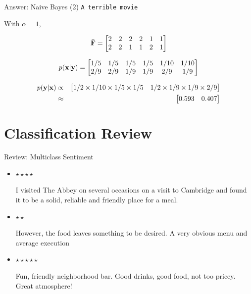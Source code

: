 \documentclass{beamer}
\begin{document}
\begin{frame}{Answer: Naive Bayes (2) }
  \texttt{A terrible movie}
  \air 

  With $\alpha = 1$,

  \[ \bar{\mathbf{F}} =
    \begin{bmatrix}
      2 & 2 & 2 & 2 & 1 & 1 \\
      2 & 2 & 1 & 1 & 2 & 1 \\
    \end{bmatrix}
  \] 

  \[ p(\mathbf{x} | \mathbf{y}) =     \begin{bmatrix}
      1/5 & 1/5 & 1/5 & 1/5 & 1/10 & 1/10 \\
      2/9 & 2/9 & 1/9 & 1/9 & 2/9 & 1/9 \\
    \end{bmatrix} 
  \]

  \begin{eqnarray*}
    p(\mathbf{y} | \mathbf{x}) &\propto& \begin{bmatrix} 1/2 \times 1/10 \times 1/5 \times 1/5 &  1/2 \times 1/9 \times 1/9 \times 2/9  \end{bmatrix} \\
    &\approx&     \begin{bmatrix} 0.593 & 0.407 \end{bmatrix} 
  \end{eqnarray*}



\end{frame}
\section{Classification Review}

\begin{frame}{Review: Multiclass Sentiment}
    \begin{itemize}
    \item 
      $\star \star \star \star$

      I visited The Abbey on several occasions on a visit to Cambridge and found it to be a solid, reliable and friendly place for a meal.
      
    \item $\star \star$ 

      However, the food leaves something to be desired. A very obvious menu and average execution

    \item $\star \star \star \star \star$

      Fun, friendly neighborhood bar. Good drinks, good food, not too pricey. Great atmosphere!
  \end{itemize}
\end{frame}
\end{document}
